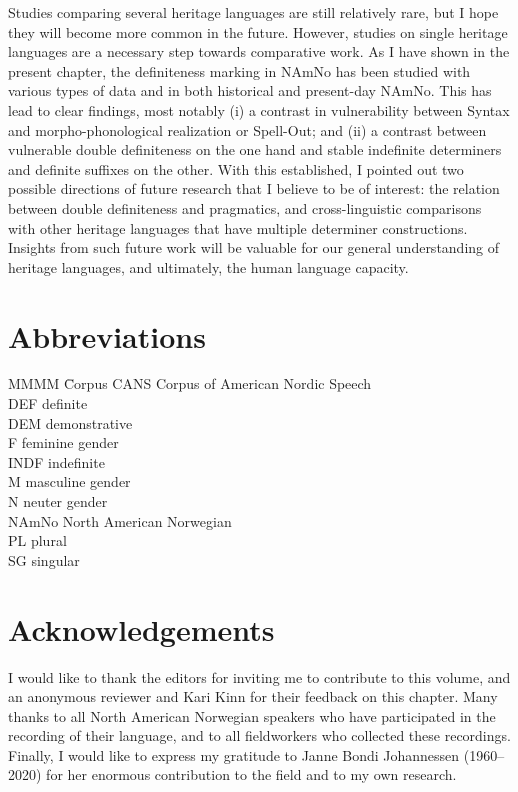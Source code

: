 \documentclass[output=paper]{langscibook}
\begin{document}
Studies comparing several heritage languages are still relatively rare, but I hope they will become more common in the future. However, studies on single heritage languages are a necessary step towards comparative work. As I have shown in the present chapter, the definiteness marking in NAmNo has been studied with various types of data and in both historical and present-day NAmNo. This has lead to clear findings, most notably (i) a contrast in vulnerability between Syntax and morpho-phonological realization or Spell-Out; and (ii) a contrast between vulnerable double definiteness on the one hand and stable indefinite determiners and definite suffixes on the other. With this established, I pointed out two possible directions of future research that I believe to be of interest: the relation between double definiteness and pragmatics, and cross-linguistic comparisons with other heritage languages that have multiple determiner constructions. Insights from such future work will be valuable for our general understanding of heritage languages, and ultimately, the human language capacity.
 

\section*{Abbreviations}
\begin{tabbing}
MMMM \= Corpus\kill
CANS \> Corpus of American Nordic Speech \\
DEF \> definite \\
DEM \> demonstrative \\
F \> feminine gender \\
INDF \> indefinite \\
M \> masculine gender \\
N \> neuter gender \\
NAmNo \> North American Norwegian \\
PL \> plural \\
SG \> singular \\
\end{tabbing}

\section*{Acknowledgements}
I would like to thank the editors for inviting me to contribute to this volume, and an anonymous reviewer and Kari Kinn for their feedback on this chapter. Many thanks to all North American Norwegian speakers who have participated in the recording of their language, and to all fieldworkers who collected these recordings. Finally, I would like to express my gratitude to Janne Bondi Johannessen (1960--2020) for her enormous contribution to the field and to my own research. 
\end{document}
